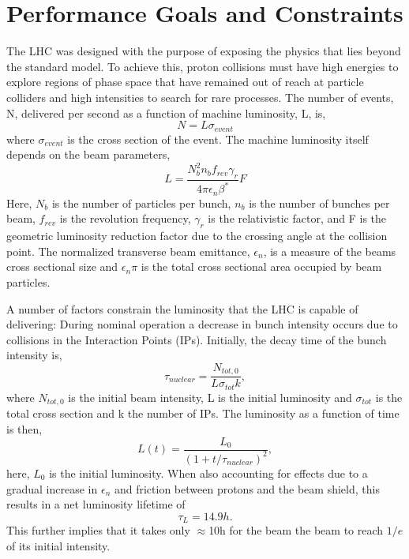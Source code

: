 \section{Performance Goals and Constraints}
The LHC was designed with the purpose of
exposing the physics that lies beyond the standard
model. To achieve this, proton collisions must 
have high energies to explore regions of phase space that 
have remained out of reach at particle colliders and high 
intensities to search for rare processes.
The number of events, N, delivered per second as a function
of machine luminosity, L, is,
\begin{equation}
N=L\sigma_{event}
\end{equation}
where $\sigma_{event}$ is the cross section of the event.
The machine luminosity itself depends on the beam parameters,
\begin{equation}
L=\frac{N_{b}^{2}n_{b}f_{rev}\gamma_{r}}{4\pi \epsilon_{n}\beta^{*}}F
\end{equation}
Here, $N_{b}$ is the number of particles per bunch, $n_{b}$
is the number of bunches per beam, $f_{rev}$ is the
revolution frequency, $\gamma_{r}$ is the relativistic factor, 
and F is the geometric luminosity reduction factor due to the crossing
angle at the collision point. %
The normalized transverse beam emittance, $\epsilon_{n}$, is a measure of the
beams cross sectional size and $\epsilon_{n}\pi$ is the 
total cross sectional area occupied by beam particles. 

A number of factors constrain the luminosity that the LHC is capable
of delivering:%
During nominal operation a decrease in bunch intensity occurs
due to collisions in the Interaction Points (IPs).
Initially, the decay time of the bunch intensity is,
\begin{equation}
\tau_{nuclear}=\frac{N_{tot,0}}{L\sigma_{tot}k},
\end{equation}
where $N_{tot,0}$ is the initial beam intensity, L is the initial
luminosity and $\sigma_{tot}$ is the total cross section and 
k the number of IPs.
The luminosity as a function of time is then,
\begin{equation}
L(t)=\frac{L_{0}}{(1+t/\tau_{nuclear})^{2}},
\end{equation}
here, $L_{0}$ is the initial luminosity.
When also accounting for effects due to a gradual increase in
 $\epsilon_{n}$ and friction between protons and the 
 beam shield, this results in a net luminosity lifetime of 
\begin{equation}
\tau_{L} = 14.9 h .
\end{equation}
This further implies that it takes only $\approx$10h for the
beam the beam to reach $1/e$ of its initial intensity.

